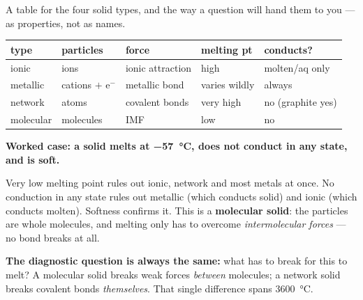 \documentclass{apchem-worksheet}
\begin{document}
\begin{workedexample}
A table for the four solid types, and the way a question will hand them
to you --- as properties, not as names.

\begin{center}
\renewcommand{\arraystretch}{1.25}
\begin{tabular}{@{}lllll@{}}
\toprule
\textbf{type} & \textbf{particles} & \textbf{force} &
  \textbf{melting pt} & \textbf{conducts?} \\
\midrule
ionic     & ions          & ionic attraction & high      &
  molten/aq only \\
metallic  & cations $+$ e$^-$ & metallic bond & varies wildly &
  always \\
network   & atoms         & covalent bonds   & very high &
  no (graphite yes) \\
molecular & molecules     & IMF              & low       & no \\
\bottomrule
\end{tabular}
\end{center}

\textbf{Worked case: a solid melts at \SI{-57}{\celsius}, does not
conduct in any state, and is soft.}

Very low melting point rules out ionic, network and most metals at once.
No conduction in any state rules out metallic (which conducts solid) and
ionic (which conducts molten). Softness confirms it. This is a
\textbf{molecular solid}: the particles are whole molecules, and melting
only has to overcome \emph{intermolecular forces} --- no bond breaks at
all.

\textbf{The diagnostic question is always the same:} what has to break
for this to melt? A molecular solid breaks weak forces \emph{between}
molecules; a network solid breaks covalent bonds \emph{themselves}. That
single difference spans \SI{3600}{\celsius}.
\end{workedexample}
\end{document}

